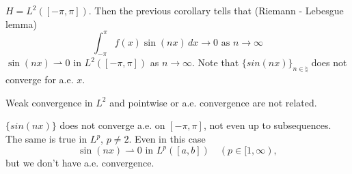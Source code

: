 \begin{example}
    \(H = L^2([-\pi, \pi])\). Then the previous corollary tells that (Riemann - Lebesgue lemma)
    \[
        \int_{-\pi}^\pi f(x) \sin (nx) \, dx \to 0 \text{ as } n \to \infty
    \]                
    \(\sin(nx) \rightharpoonup 0\) in \(L^2([-\pi, \pi])\) as \(n \to \infty\). Note that \(\{sin(nx)\}_{n \in \natural}\) does not converge for a.e. \(x\).
    
    Weak convergence in \(L^2\) and pointwise or a.e. convergence are not related.
    
    \(\{sin(nx)\}\) does not converge a.e. on \([-\pi, \pi]\), not even up to subsequences. 
    The same is true in \(L^p\), \(p \neq 2\). Even in this case
    \[
        \sin(nx) \rightharpoonup 0 \text{ in } L^p([a,b]) \quad (p \in [1, \infty),
    \] 
    but we don't have a.e. convergence.
\end{example}
